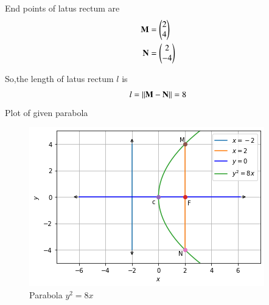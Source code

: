 \documentclass[journal,12pt,twocolumn]{IEEEtran}
\begin{document}
End points of latus rectum are
\begin{align}
\mathbf{M} &= \begin{pmatrix}2\\4\end{pmatrix}
\\
\mathbf{N} &= \begin{pmatrix}2\\-4\end{pmatrix}
\end{align}

So,the length of latus rectum $l$ is 
\begin{align}
l = \left\lVert\mathbf{M}-\mathbf{N}\right\rVert = 8
\end{align}
\newpage
Plot of given parabola

\begin{figure}[!ht]
\centering
\includegraphics[width=\columnwidth]{Figure6}
\caption{Parabola $y^2=8x$ }
\label{fig:parabola}	
\end{figure}
\end{document}
